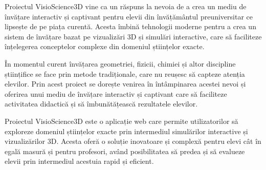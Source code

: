 
Proiectul VisioScience3D vine ca un răspuns la nevoia de a crea un mediu de învățare interactiv
și captivant pentru elevii din învățământul preuniversitar ce lipsește de pe piața curentă.
Acesta îmbină tehnologii moderne pentru a crea un sistem de învățare bazat pe vizualizări 3D
și simulări interactive, care să faciliteze înțelegerea conceptelor complexe din domeniul științelor exacte.

În momentul curent învățarea geometriei, fizicii, chimiei și altor discipline științifice
se face prin metode tradiționale, care nu reușesc să capteze atenția elevilor.
Prin acest proiect se dorește venirea în întâmpinarea acestei nevoi și oferirea
unui mediu de învățare interactiv și captivant care să faciliteze
activitatea didactică și să îmbunătățească rezultatele elevilor.

Proiectul VisioScience3D este o aplicație web care permite utilizatorilor să exploreze
domeniul științelor exacte prin intermediul simulărilor interactive și vizualizărilor 3D.
Acesta oferă o soluție inovatoare și complexă pentru elevi cât în egală masură și pentru
profesori, având posibilitatea să predea și să evalueze elevii prin intermediul acestuia rapid și eficient.